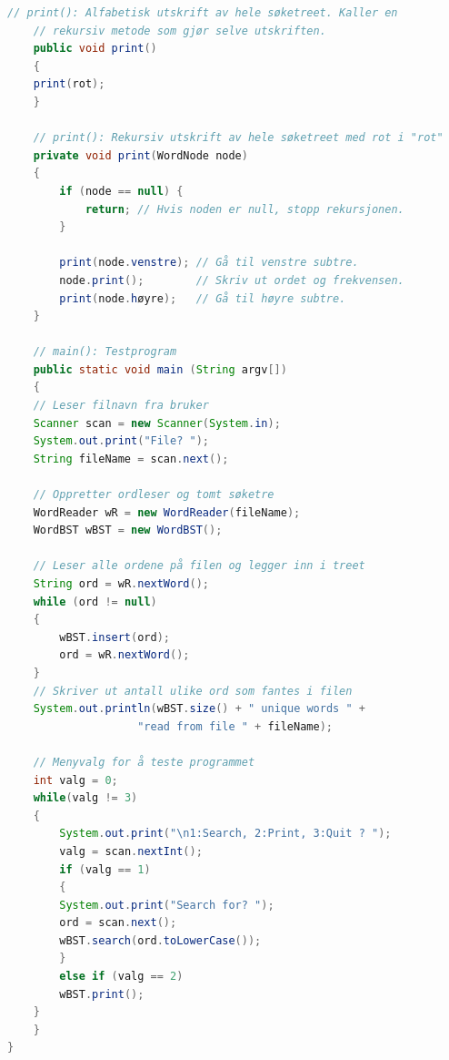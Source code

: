 \documentclass[twocolumn]{article}
\begin{document}
\begin{lstlisting}[language=Java, frame=single]
    // print(): Alfabetisk utskrift av hele søketreet. Kaller en
    // rekursiv metode som gjør selve utskriften.
    public void print()
    {
	print(rot);
    }

    // print(): Rekursiv utskrift av hele søketreet med rot i "rot"
    private void print(WordNode node)
    {
		if (node == null) {
			return; // Hvis noden er null, stopp rekursjonen.
		}
	
		print(node.venstre); // Gå til venstre subtre.
		node.print();        // Skriv ut ordet og frekvensen.
		print(node.høyre);   // Gå til høyre subtre.
	}
    
    // main(): Testprogram
    public static void main (String argv[])
    {
	// Leser filnavn fra bruker
	Scanner scan = new Scanner(System.in);
	System.out.print("File? ");
	String fileName = scan.next();

	// Oppretter ordleser og tomt søketre
	WordReader wR = new WordReader(fileName);
	WordBST wBST = new WordBST();

	// Leser alle ordene på filen og legger inn i treet
	String ord = wR.nextWord();
	while (ord != null)
	{
	    wBST.insert(ord);
	    ord = wR.nextWord();
	}
	// Skriver ut antall ulike ord som fantes i filen
	System.out.println(wBST.size() + " unique words " +
                    "read from file " + fileName);

	// Menyvalg for å teste programmet
	int valg = 0;
	while(valg != 3)
	{
	    System.out.print("\n1:Search, 2:Print, 3:Quit ? ");
	    valg = scan.nextInt();
	    if (valg == 1)
	    {
		System.out.print("Search for? ");
		ord = scan.next();
		wBST.search(ord.toLowerCase());
	    }
	    else if (valg == 2)
		wBST.print();
	}
    }
}
\end{lstlisting}
\end{document}
